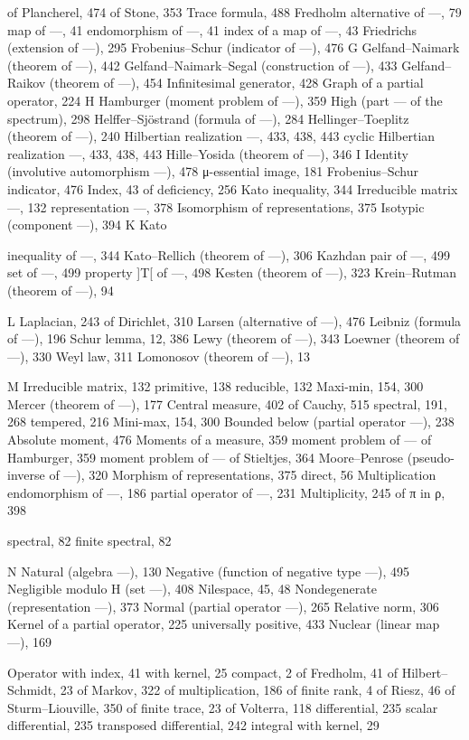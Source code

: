 of Plancherel, 474 of Stone, 353 Trace formula, 488 Fredholm alternative of ---, 79 map of ---, 41 endomorphism of ---, 41 index of a map of ---, 43 Friedrichs (extension of ---), 295 Frobenius--Schur (indicator of ---), 476 G Gelfand--Naimark (theorem of ---), 442 Gelfand--Naimark--Segal (construction of ---), 433 Gelfand--Raikov (theorem of ---), 454 Infinitesimal generator, 428 Graph of a partial operator, 224 H Hamburger (moment problem of ---), 359 High (part --- of the spectrum), 298 Helffer--Sjöstrand (formula of ---), 284 Hellinger--Toeplitz (theorem of ---), 240 Hilbertian realization ---, 433, 438, 443 cyclic Hilbertian realization ---, 433, 438, 443 Hille--Yosida (theorem of ---), 346 I Identity (involutive automorphism ---), 478 μ-essential image, 181 Frobenius--Schur indicator, 476 Index, 43 of deficiency, 256 Kato inequality, 344 Irreducible matrix ---, 132 representation ---, 378 Isomorphism of representations, 375 Isotypic (component ---), 394 K Kato

inequality of ---, 344 Kato--Rellich (theorem of ---), 306 Kazhdan pair of ---, 499 set of ---, 499 property {]}T{[} of ---, 498 Kesten (theorem of ---), 323 Krein--Rutman (theorem of ---), 94

L Laplacian, 243 of Dirichlet, 310 Larsen (alternative of ---), 476 Leibniz (formula of ---), 196 Schur lemma, 12, 386 Lewy (theorem of ---), 343 Loewner (theorem of ---), 330 Weyl law, 311 Lomonosov (theorem of ---), 13

M Irreducible matrix, 132 primitive, 138 reducible, 132 Maxi-min, 154, 300 Mercer (theorem of ---), 177 Central measure, 402 of Cauchy, 515 spectral, 191, 268 tempered, 216 Mini-max, 154, 300 Bounded below (partial operator ---), 238 Absolute moment, 476 Moments of a measure, 359 moment problem of --- of Hamburger, 359 moment problem of --- of Stieltjes, 364 Moore--Penrose (pseudo-inverse of ---), 320 Morphism of representations, 375 direct, 56 Multiplication endomorphism of ---, 186 partial operator of ---, 231 Multiplicity, 245 of π in ρ, 398

spectral, 82 finite spectral, 82

N Natural (algebra ---), 130 Negative (function of negative type ---), 495 Negligible modulo H (set ---),
408
Nilespace, 45, 48 Nondegenerate (representation ---),
373
Normal (partial operator ---), 265 Relative norm, 306 Kernel of a partial operator, 225 universally positive, 433 Nuclear (linear map ---),
169

Operator with index, 41 with kernel, 25 compact, 2 of Fredholm, 41 of Hilbert--Schmidt, 23 of Markov, 322 of multiplication, 186 of finite rank, 4 of Riesz, 46 of Sturm--Liouville, 350 of finite trace, 23 of Volterra, 118 differential, 235 scalar differential, 235 transposed differential, 242 integral with kernel, 29

